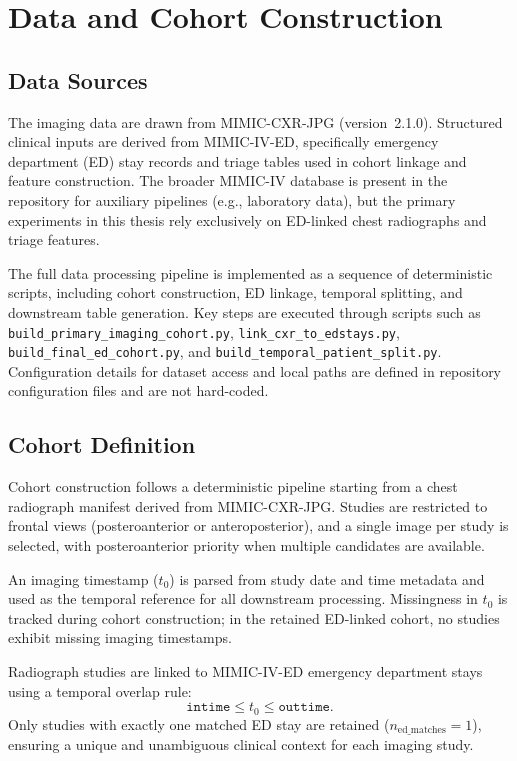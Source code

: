 \chapter{Data and Cohort Construction}

\section{Data Sources}

The imaging data are drawn from MIMIC-CXR-JPG (version~2.1.0). Structured clinical inputs are derived from MIMIC-IV-ED, specifically emergency department (ED) stay records and triage tables used in cohort linkage and feature construction. The broader MIMIC-IV database is present in the repository for auxiliary pipelines (e.g., laboratory data), but the primary experiments in this thesis rely exclusively on ED-linked chest radiographs and triage features.

The full data processing pipeline is implemented as a sequence of deterministic scripts, including cohort construction, ED linkage, temporal splitting, and downstream table generation. Key steps are executed through scripts such as \texttt{build\_primary\_imaging\_cohort.py}, \texttt{link\_cxr\_to\_edstays.py}, \texttt{build\_final\_ed\_cohort.py}, and \texttt{build\_temporal\_patient\_split.py}. Configuration details for dataset access and local paths are defined in repository configuration files and are not hard-coded.

\section{Cohort Definition}

Cohort construction follows a deterministic pipeline starting from a chest radiograph manifest derived from MIMIC-CXR-JPG. Studies are restricted to frontal views (posteroanterior or anteroposterior), and a single image per study is selected, with posteroanterior priority when multiple candidates are available.

An imaging timestamp ($t_0$) is parsed from study date and time metadata and used as the temporal reference for all downstream processing. Missingness in $t_0$ is tracked during cohort construction; in the retained ED-linked cohort, no studies exhibit missing imaging timestamps.

Radiograph studies are linked to MIMIC-IV-ED emergency department stays using a temporal overlap rule:
\[
\texttt{intime} \leq t_0 \leq \texttt{outtime}.
\]
Only studies with exactly one matched ED stay are retained ($n_{\text{ed\_matches}} = 1$), ensuring a unique and unambiguous clinical context for each imaging study.

